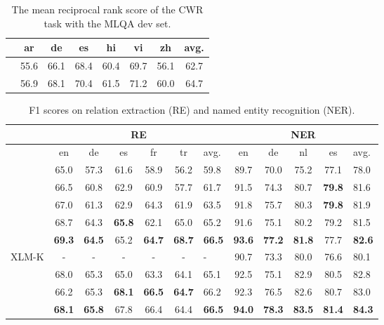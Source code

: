\documentclass[11pt]{article}
\begin{document}
\begin{table}[ht]
  \small
  \setlength\tabcolsep{3pt}
  \centering
  \begin{tabular}{lccccccc} \toprule
        &     ar      &     de     &     es     &     hi     &     vi     &     zh     &    avg.    \\ \midrule
\mlukeW{}\ba{}  &    55.6    &    66.1    &    68.4    &    60.4    &    69.7    &    56.1    &    62.7    \\
\mlukeE{}\ba{}  &    56.9    &    68.1    &    70.4    &    61.5    &    71.2    &    60.0    &    64.7    \\ \bottomrule
  \end{tabular}
  \caption{The mean reciprocal rank score of the CWR task with the MLQA dev set.}
  \label{table:squad_retrieval}
\end{table}
 \begin{table*}[ht]
    \small
  \centering
\begin{tabular}{l|cccccl|ccccl} \toprule
                & \multicolumn{6}{c|}{RE} & \multicolumn{5}{c}{NER}         \\ \midrule
                & en   & de   & es   & fr   & tr   & avg. & en   & de   & nl   & es   & avg. \\ \midrule
\mbert{}       & 65.0 & 57.3 & 61.6 & 58.9 & 56.2 & 59.8 & 89.7 & 70.0 & 75.2 & 77.1 & 78.0 \\
\xlmr{}\ba{}        & 66.5 & 60.8 & 62.9 & 60.9 & 57.7 & 61.7 & 91.5 & 74.3 & 80.7 & {\bf 79.8} & 81.6 \\
\extraTraining{} & 67.0 & 61.3 & 62.9 & 64.3 & 61.9 & 63.5 & 91.8 & 75.7 & 80.3 & {\bf 79.8} & 81.9 \\
\mlukeW{}\ba{}      & 68.7 & 64.3 & {\bf 65.8} & 62.1 & 65.0 & 65.2 & 91.6 & 75.1 & 80.2 & 79.2 & 81.5 \\
\mlukeE{}\ba{}      & {\bf 69.3} & {\bf 64.5} & 65.2 & {\bf 64.7} & {\bf 68.7} & {\bf 66.5} & {\bf 93.6} & {\bf 77.2} & {\bf 81.8} & 77.7 & {\bf 82.6} \\
\midrule
XLM-K \citep{XLM-K-2021-arxiv} & - & - & - & - & - & - & 90.7 & 73.3 & 80.0 & 76.6 & 80.1 \\
\midrule
\xlmr{}\la{}        & 68.0 & 65.3 & 65.0 & 63.3 & 64.1 & 65.1 & 92.5 & 75.1 & 82.9 & 80.5 & 82.8 \\
\mlukeW{}\la{}      & 66.2 & 65.3 & {\bf 68.1} & {\bf 66.5} & {\bf 64.7} & 66.2 & 92.3 & 76.5 & 82.6 & 80.7 & 83.0 \\
\mlukeE{}\la{}      & {\bf 68.1} & {\bf 65.8} & 67.8 & 66.4 & 64.4 & {\bf 66.5} & {\bf 94.0} & {\bf 78.3} & {\bf 83.5} & {\bf 81.4} & {\bf 84.3} \\  
\bottomrule
\end{tabular}
\caption{F1 scores on relation extraction (RE) and named entity recognition (NER).}
\label{table:results-entity}
\vspace{-4mm}
\end{table*}
\end{document}
